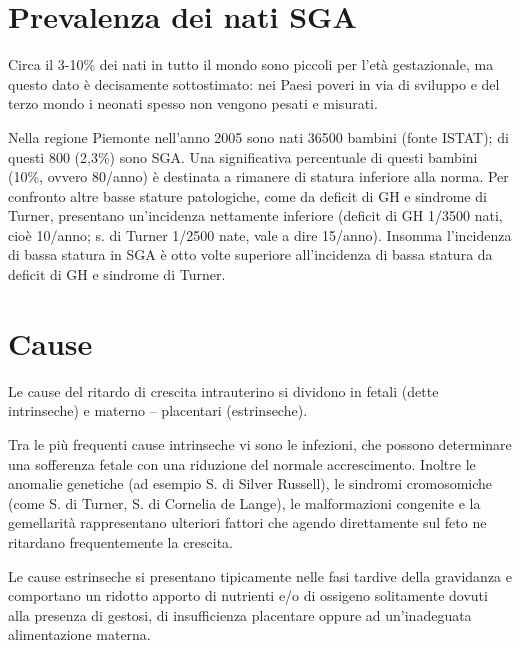 \section{Prevalenza dei nati SGA}

Circa il 3-10\% dei nati in tutto il mondo sono piccoli per l'età gestazionale, 
ma questo dato è decisamente sottostimato: nei Paesi poveri in via di sviluppo 
e del terzo mondo i neonati spesso non vengono pesati e misurati\cite{sga-1}.

Nella regione Piemonte nell'anno 2005 sono nati 36500 bambini (fonte ISTAT); di questi 800 (2,3\%) sono SGA. Una significativa percentuale di questi bambini (10\%, ovvero 80/anno) è destinata a rimanere di statura inferiore alla norma. Per confronto altre basse stature patologiche, come da deficit di GH e sindrome di Turner, presentano un'incidenza nettamente inferiore (deficit di GH 1/3500 nati, cioè 10/anno; s. di Turner 1/2500 nate, vale a dire 15/anno). Insomma l'incidenza di bassa statura in SGA è otto volte superiore all'incidenza di bassa statura da deficit di GH e sindrome di Turner. 


\section{Cause}


Le cause del ritardo di crescita intrauterino si dividono in
fetali (dette intrinseche) e materno -- placentari (estrinseche).


Tra le più frequenti cause intrinseche vi sono le infezioni, che possono determinare una sofferenza
fetale con una riduzione del normale accrescimento. 
Inoltre le anomalie genetiche (ad esempio S. di Silver Russell), le sindromi cromosomiche (come S. di Turner, S. di Cornelia de Lange), le malformazioni congenite e la gemellarità rappresentano
ulteriori fattori che agendo direttamente sul feto ne ritardano frequentemente la crescita.


Le cause estrinseche si presentano tipicamente nelle fasi tardive della gravidanza
e comportano un ridotto apporto di nutrienti e/o di ossigeno solitamente dovuti alla presenza di 
gestosi, di insufficienza placentare oppure ad un'inadeguata alimentazione materna.


